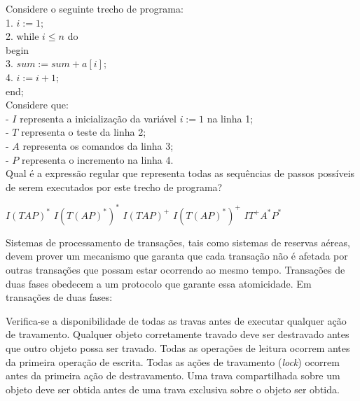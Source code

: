 \documentclass[12pt, addpoints]{exam}
\begin{document}
\begin{questions}
\question

Considere o seguinte trecho de programa:\\

1. \( i := 1; \)\\

2. while \( i \leq n \) do\\

   begin\\

3. \( sum := sum + a[i]; \)\\

4. \( i := i + 1; \)\\

   end;\\



Considere que:\\

- \( I \) representa a inicialização da variável \( i := 1 \) na linha 1;\\

- \( T \) representa o teste da linha 2;\\

- \( A \) representa os comandos da linha 3;\\

- \( P \) representa o incremento na linha 4.\\



Qual é a expressão regular que representa todas as sequências de passos possíveis de serem executados por este trecho de programa?
\begin{choices}
\choice \( I(TAP)^* \)
\choice \( I(T(AP)^*)^* \)
\choice \( I(TAP)^+ \)
\choice \( I(T(AP)^*)^+ \)
\choice \( IT^+A^*P^* \)
\end{choices}

\question

Sistemas de processamento de transações, tais como sistemas de reservas aéreas, devem prover um mecanismo que garanta que cada transação não é afetada por outras transações que possam estar ocorrendo ao mesmo tempo. Transações de duas fases obedecem a um protocolo que garante essa atomicidade. Em transações de duas fases:


\begin{choices}
\choice Verifica-se a disponibilidade de todas as travas antes de executar qualquer ação de travamento.
\choice Qualquer objeto corretamente travado deve ser destravado antes que outro objeto possa ser travado.
\choice Todas as operações de leitura ocorrem antes da primeira operação de escrita.
\choice Todas as ações de travamento (\textit{lock}) ocorrem antes da primeira ação de destravamento.
\choice Uma trava compartilhada sobre um objeto deve ser obtida antes de uma trava exclusiva sobre o objeto ser obtida.
\end{choices}


\end{questions}
\end{document}
